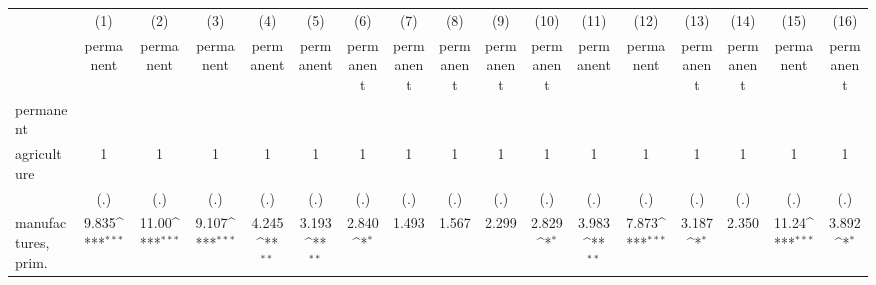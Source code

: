 {
\def\sym#1{\ifmmode^{#1}\else\(^{#1}\)\fi}
\begin{tabular}{l*{16}{c}}
\hline\hline
                    &\multicolumn{1}{c}{(1)}&\multicolumn{1}{c}{(2)}&\multicolumn{1}{c}{(3)}&\multicolumn{1}{c}{(4)}&\multicolumn{1}{c}{(5)}&\multicolumn{1}{c}{(6)}&\multicolumn{1}{c}{(7)}&\multicolumn{1}{c}{(8)}&\multicolumn{1}{c}{(9)}&\multicolumn{1}{c}{(10)}&\multicolumn{1}{c}{(11)}&\multicolumn{1}{c}{(12)}&\multicolumn{1}{c}{(13)}&\multicolumn{1}{c}{(14)}&\multicolumn{1}{c}{(15)}&\multicolumn{1}{c}{(16)}\\
                    &\multicolumn{1}{c}{permanent}&\multicolumn{1}{c}{permanent}&\multicolumn{1}{c}{permanent}&\multicolumn{1}{c}{permanent}&\multicolumn{1}{c}{permanent}&\multicolumn{1}{c}{permanent}&\multicolumn{1}{c}{permanent}&\multicolumn{1}{c}{permanent}&\multicolumn{1}{c}{permanent}&\multicolumn{1}{c}{permanent}&\multicolumn{1}{c}{permanent}&\multicolumn{1}{c}{permanent}&\multicolumn{1}{c}{permanent}&\multicolumn{1}{c}{permanent}&\multicolumn{1}{c}{permanent}&\multicolumn{1}{c}{permanent}\\
\hline
permanent           &                     &                     &                     &                     &                     &                     &                     &                     &                     &                     &                     &                     &                     &                     &                     &                     \\
agriculture         &           1         &           1         &           1         &           1         &           1         &           1         &           1         &           1         &           1         &           1         &           1         &           1         &           1         &           1         &           1         &           1         \\
                    &         (.)         &         (.)         &         (.)         &         (.)         &         (.)         &         (.)         &         (.)         &         (.)         &         (.)         &         (.)         &         (.)         &         (.)         &         (.)         &         (.)         &         (.)         &         (.)         \\
[1em]
manufactures, prim. &       9.835\sym{***}&       11.00\sym{***}&       9.107\sym{***}&       4.245\sym{**} &       3.193\sym{**} &       2.840\sym{*}  &       1.493         &       1.567         &       2.299         &       2.829\sym{*}  &       3.983\sym{**} &       7.873\sym{***}&       3.187\sym{*}  &       2.350         &       11.24\sym{***}&       3.892\sym{*}  \\

\end{tabular}}
